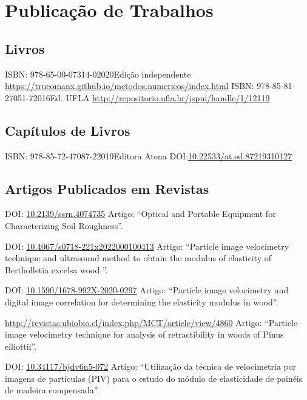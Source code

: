 \documentclass[11pt,a4paper,sans]{moderncv} %
\newcommand{\doiurl}[1]{\href{https://doi.org/#1}{#1}}
\begin{document}
\section{Publicação de Trabalhos}
\subsection{Livros}
	      {ISBN: 978-65-00-07314-0}{2020}{Edição independente}
	      {\url{https://trucomanx.github.io/metodos.numericos/index.html}}
	      {ISBN: 978-85-81-27051-7}{2016}{Ed. UFLA}
	      {\url{http://repositorio.ufla.br/jspui/handle/1/12119}}

\subsection{Capítulos de Livros}
	      {ISBN: 978-85-72-47087-2}{2019}{Editora Atena}
	      {DOI:\doiurl{10.22533/at.ed.87219310127}}

\subsection{Artigos Publicados em Revistas}

	      {DOI: \doiurl{10.2139/ssrn.4074735} }{}{}
	      {Artigo: ``Optical and Portable Equipment for Characterizing Soil Roughness''.}
	      
	      {DOI: \doiurl{10.4067/s0718-221x2022000100413} }{}{}
	      {Artigo: ``Particle image velocimetry technique and ultrasound method to obtain the modulus of elasticity of Bertholletia excelsa wood ''.}
	      
	      {DOI: \doiurl{10.1590/1678-992X-2020-0297} }{}{}
	      {Artigo: ``Particle image velocimetry and digital image correlation for determining the elasticity modulus in wood''.}
	      
	      {\url{http://revistas.ubiobio.cl/index.php/MCT/article/view/4860}}{}{}
	      {Artigo: ``Particle image velocimetry technique for analysis of retractibility in woods of Pinus elliottii''.}
	      
	      {DOI: \doiurl{10.34117/bjdv6n5-072}}{}{}
	      {Artigo: ``Utilização da técnica de velocimetria por imagens de partículas (PIV) para o estudo do módulo de elasticidade de painéis de madeira compensada''.}
\end{document}
